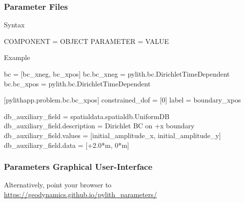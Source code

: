 \documentclass[aspectratio=169]{beamer}
\begin{document}
\begin{frame}[fragile]
  \frametitle{Parameter Files}

  Syntax\vspace*{-8pt}%
  \begin{cfgcode}
    COMPONENT = OBJECT
    PARAMETER = VALUE
  \end{cfgcode}

  \vspace*{-4pt}%
  Example\vspace*{-8pt}%
  \begin{cfgcode}
      bc = [bc_xneg, bc_xpos]
      bc.bc_xneg = pylith.bc.DirichletTimeDependent
      bc.bc_xpos = pylith.bc.DirichletTimeDependent

      [pylithapp.problem.bc.bc_xpos]
      constrained_dof = [0]
      label = boundary_xpos

      db_auxiliary_field = spatialdata.spatialdb.UniformDB
      db_auxiliary_field.description = Dirichlet BC on +x boundary
      db_auxiliary_field.values = [initial_amplitude_x, initial_amplitude_y]
      db_auxiliary_field.data = [+2.0*m, 0*m]
    \end{cfgcode}

\end{frame}


\begin{frame}
  \frametitle{Parameters Graphical User-Interface}

  Alternatively, point your browser to \url{https://geodynamics.github.io/pylith_parameters/}\\
  

\end{frame}
\end{document}
